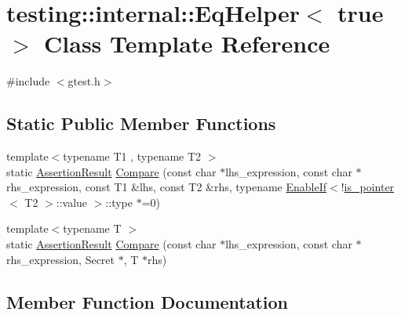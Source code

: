 \hypertarget{classtesting_1_1internal_1_1EqHelper_3_01true_01_4}{}\section{testing\+:\+:internal\+:\+:Eq\+Helper$<$ true $>$ Class Template Reference}
\label{classtesting_1_1internal_1_1EqHelper_3_01true_01_4}


{\ttfamily \#include $<$gtest.\+h$>$}

\subsection*{Static Public Member Functions}
\begin{DoxyCompactItemize}
\item 
{\footnotesize template$<$typename T1 , typename T2 $>$ }\\static \hyperlink{classtesting_1_1AssertionResult}{Assertion\+Result} \hyperlink{classtesting_1_1internal_1_1EqHelper_3_01true_01_4_a12c7194b2a210b61f06c912eef484ca6}{Compare} (const char $\ast$lhs\+\_\+expression, const char $\ast$rhs\+\_\+expression, const T1 \&lhs, const T2 \&rhs, typename \hyperlink{structtesting_1_1internal_1_1EnableIf}{Enable\+If}$<$!\hyperlink{structtesting_1_1internal_1_1is__pointer}{is\+\_\+pointer}$<$ T2 $>$\+::value $>$\+::type $\ast$=0)
\item 
{\footnotesize template$<$typename T $>$ }\\static \hyperlink{classtesting_1_1AssertionResult}{Assertion\+Result} \hyperlink{classtesting_1_1internal_1_1EqHelper_3_01true_01_4_a6f292601a68c8f0d49e6d48bd309b900}{Compare} (const char $\ast$lhs\+\_\+expression, const char $\ast$rhs\+\_\+expression, Secret $\ast$, T $\ast$rhs)
\end{DoxyCompactItemize}


\subsection{Member Function Documentation}
